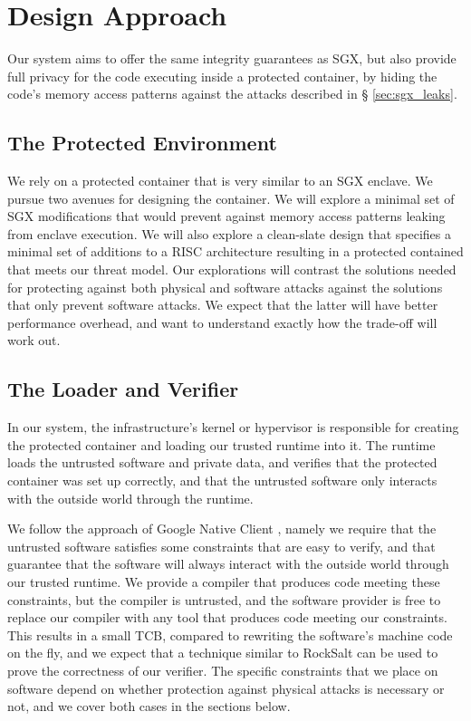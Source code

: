 \section{Design Approach}
\label{sec:design}

Our system aims to offer the same integrity guarantees as SGX, but also provide
full privacy for the code executing inside a protected container, by hiding the
code's memory access patterns against the attacks described in \S
\ref{sec:sgx_leaks}.

\subsection{The Protected Environment}
\label{sec:protected_environment}


We rely on a protected container that is very similar to an SGX enclave. We
pursue two avenues for designing the container. We will explore a minimal set
of SGX modifications that would prevent against memory access patterns leaking
from enclave execution. We will also explore a clean-slate design that
specifies a minimal set of additions to a RISC architecture resulting in a
protected contained that meets our threat model. Our explorations will contrast
the solutions needed for protecting against both physical and software attacks
against the solutions that only prevent software attacks. We expect that the
latter will have better performance overhead, and want to understand exactly
how the trade-off will work out.

\subsection{The Loader and Verifier}
\label{sec:loader_verifier}

In our system, the infrastructure's kernel or hypervisor is responsible for
creating the protected container and loading our trusted runtime into it. The
runtime loads the untrusted software and private data, and verifies that the
protected container was set up correctly, and that the untrusted software
only interacts with the outside world through the runtime.

We follow the approach of Google Native Client \cite{yee2009native}
\cite{sehr2010adapting}, namely we require that the untrusted software
satisfies some constraints that are easy to verify, and that guarantee that the
software will always interact with the outside world through our trusted
runtime. We provide a compiler that produces code meeting these constraints,
but the compiler is untrusted, and the software provider is free to replace our
compiler with any tool that produces code meeting our constraints. This results
in a small TCB, compared to rewriting the software's machine code on the fly,
and we expect that a technique similar to RockSalt \cite{morrisett2012rocksalt}
can be used to prove the correctness of our verifier. The specific constraints
that we place on software depend on whether protection against physical attacks
is necessary or not, and we cover both cases in the sections below.

